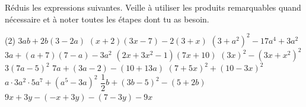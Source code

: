 %
%
Réduis les expressions suivantes. Veille à utiliser les produits remarquables quand nécessaire et à noter toutes les étapes dont tu as besoin.
  \begin{tasks}(2)
    \task $3ab+2b\left(3-2a\right)$
    \task $\left(x+2\right)\left(3x-7\right) -2\left(3+x\right)$
    \task $\left(3+a^2\right)^2 - 17a^4 + 3a^2$
    \task $3a + \left(a+7\right)\left(7-a\right)-3a^2$
    \task $\left(2x+3x^2-1\right)\left(7x+10\right)$
    \task $\left(3x\right)^2 - \left(3x+x^2\right)^2$
    \task $3\left(7a-5\right)^2$
    \task $7a+\left(3a-2\right) - \left(10+13a\right)$
    \task $\left(7+5x\right)^2 + \left(10-3x\right)^2$
    \task $a\cdot 3a^2 \cdot 5a^7 + \left(a^5-3a\right)^2$
    \task $\dfrac{1}{2}b + \left(3b-5\right)^2 - \left(5+2b\right)$
    \task $9x+3y-\left(-x+3y\right) - \left(7-3y\right) -9x$
  \end{tasks}

